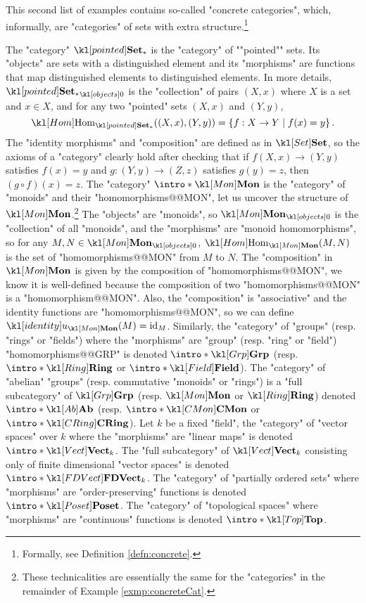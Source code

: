 \documentclass[main.tex]{subfiles}
\begin{document}
\begin{exmps}\label{exmp:concreteCat}
	This second list of examples contains so-called "concrete categories", which, informally, are "categories" of sets with extra structure.\footnote{Formally, see Definition \ref{defn:concrete}.}
	\begin{enumerate}
		\itemAP The "category" $\catPtd$ is the "category" of ""pointed"" sets. Its "objects" are sets with a distinguished element and its "morphisms" are functions that map distinguished elements to distinguished elements. In more details, $\obj{\catPtd}$ is the "collection" of pairs $(X,x)$ where $X$ is a set and $x \in X$, and for any two "pointed" sets $(X,x)$ and $(Y,y)$, 
		\[\Hom_{\catPtd}((X,x), (Y,y)) = \left\{ f: X \rightarrow Y \mid f(x) = y \right\}.\]
		The "identity morphisms" and "composition" are defined as in $\catSet$, so the axioms of a "category" clearly hold after checking that if $f(X,x) \rightarrow (Y,y)$ satisfies $f(x) =y$ and $g: (Y,y) \rightarrow (Z,z)$ satisfies $g(y) = z$, then $(g\circ f)(x) = z$.
		\itemAP The "category" $\intro*\catMon$ is the "category" of "monoids" and their "homomorphisms@@MON", let us uncover the structure of $\catMon$.\footnote{These technicalities are essentially the same for the "categories" in the remainder of Example \ref{exmp:concreteCat}.} The "objects" are "monoids", so $\obj{\catMon}$ is the "collection" of all "monoids", and the "morphisms" are "monoid homomorphisms", so for any $M, N \in \obj{\catMon}$, $\Hom_{\catMon}(M,N)$ is the set of "homomorphisms@@MON" from $M$ to $N$. The "composition" in $\catMon$ is given by the composition of "homomorphisms@@MON", we know it is well-defined because the composition of two "homomorphisms@@MON" is a "homomorphism@@MON". Also, the "composition" is "associative" and the identity functions are "homomorphisms@@MON", so we can define $\idu_{\catMon}(M) = \mathrm{id}_M$.
		\itemAP Similarly, the "category" of "groups" (resp. "rings" or "fields") where the "morphisms" are "group" (resp. "ring" or "field") "homomorphisms@@GRP" is denoted $\intro*\catGrp$ (resp. $\intro*\catRing$ or $\intro*\catField$). \AP The "category" of "abelian" "groups" (resp. commutative "monoids" or "rings") is a "full subcategory" of $\catGrp$ (resp. $\catMon$ or $\catRing$) denoted $\intro*\catAb$ (resp. $\intro*\catCMon$ or $\intro*\catCRing$).
		\itemAP Let $k$ be a fixed "field", the "category" of "vector spaces" over $k$ where the "morphisms" are "linear maps" is denoted $\intro*\catVect{k}$. \AP The "full subcategory" of $\catVect{k}$ consisting only of finite dimensional "vector spaces" is denoted $\intro*\catFDVect{k}$.
		\itemAP The "category" of "partially ordered sets" where "morphisms" are "order-preserving" functions is denoted $\intro*\catPoset$.
		\itemAP The "category" of "topological spaces" where "morphisms" are "continuous" functions is denoted $\intro*\catTop$.
	\end{enumerate}
\end{exmps}
\end{document}

